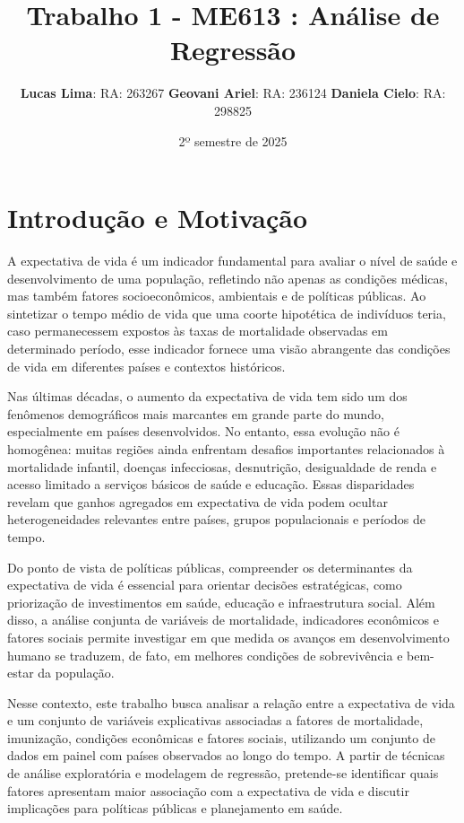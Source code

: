 \documentclass[
  12pt,
]{article}
\title{Trabalho 1 - ME613 : Análise de Regressão}
\author{\textbf{Lucas Lima}: RA: 263267 \textbf{Geovani Ariel}: RA:
236124 \textbf{Daniela Cielo}: RA: 298825}
\date{2º semestre de 2025}
\begin{document}
\maketitle

{
\setcounter{tocdepth}{2}
\tableofcontents
}
\section{Introdução e
Motivação}\label{introduuxe7uxe3o-e-motivauxe7uxe3o}

A expectativa de vida é um indicador fundamental para avaliar o nível de
saúde e desenvolvimento de uma população, refletindo não apenas as
condições médicas, mas também fatores socioeconômicos, ambientais e de
políticas públicas. Ao sintetizar o tempo médio de vida que uma coorte
hipotética de indivíduos teria, caso permanecessem expostos às taxas de
mortalidade observadas em determinado período, esse indicador fornece
uma visão abrangente das condições de vida em diferentes países e
contextos históricos.

Nas últimas décadas, o aumento da expectativa de vida tem sido um dos
fenômenos demográficos mais marcantes em grande parte do mundo,
especialmente em países desenvolvidos. No entanto, essa evolução não é
homogênea: muitas regiões ainda enfrentam desafios importantes
relacionados à mortalidade infantil, doenças infecciosas, desnutrição,
desigualdade de renda e acesso limitado a serviços básicos de saúde e
educação. Essas disparidades revelam que ganhos agregados em expectativa
de vida podem ocultar heterogeneidades relevantes entre países, grupos
populacionais e períodos de tempo.

Do ponto de vista de políticas públicas, compreender os determinantes da
expectativa de vida é essencial para orientar decisões estratégicas,
como priorização de investimentos em saúde, educação e infraestrutura
social. Além disso, a análise conjunta de variáveis de mortalidade,
indicadores econômicos e fatores sociais permite investigar em que
medida os avanços em desenvolvimento humano se traduzem, de fato, em
melhores condições de sobrevivência e bem-estar da população.

Nesse contexto, este trabalho busca analisar a relação entre a
expectativa de vida e um conjunto de variáveis explicativas associadas a
fatores de mortalidade, imunização, condições econômicas e fatores
sociais, utilizando um conjunto de dados em painel com países observados
ao longo do tempo. A partir de técnicas de análise exploratória e
modelagem de regressão, pretende-se identificar quais fatores apresentam
maior associação com a expectativa de vida e discutir implicações para
políticas públicas e planejamento em saúde.
\end{document}
